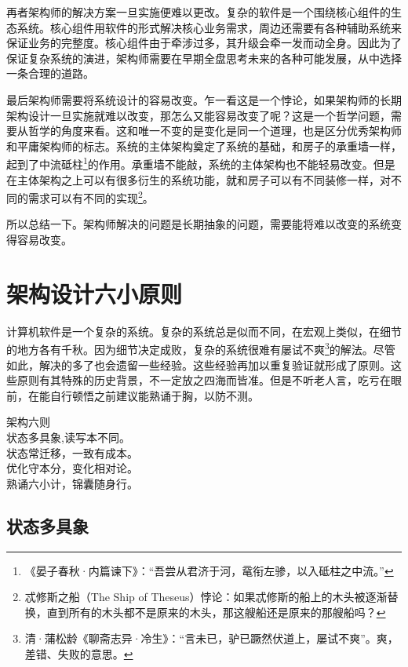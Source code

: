 再者架构师的解决方案一旦实施便难以更改。复杂的软件是一个围绕核心组件的生态系统。核心组件用软件的形式解决核心业务需求，周边还需要有各种辅助系统来保证业务的完整度。核心组件由于牵涉过多，其升级会牵一发而动全身。因此为了保证复杂系统的演进，架构师需要在早期全盘思考未来的各种可能发展，从中选择一条合理的道路。


最后架构师需要将系统设计的容易改变。乍一看这是一个悖论，如果架构师的长期架构设计一旦实施就难以改变，那怎么又能容易改变了呢？这是一个哲学问题，需要从哲学的角度来看。这和唯一不变的是变化是同一个道理，也是区分优秀架构师和平庸架构师的标志。系统的主体架构奠定了系统的基础，和房子的承重墙一样，起到了中流砥柱\footnote{《晏子春秋·内篇谏下》：“吾尝从君济于河，鼋衔左骖，以入砥柱之中流。”}的作用。承重墙不能敲，系统的主体架构也不能轻易改变。但是在主体架构之上可以有很多衍生的系统功能，就和房子可以有不同装修一样，对不同的需求可以有不同的实现\footnote{忒修斯之船（The Ship of Theseus）悖论：如果忒修斯的船上的木头被逐渐替换，直到所有的木头都不是原来的木头，那这艘船还是原来的那艘船吗？}。


所以总结一下。架构师解决的问题是长期抽象的问题，需要能将难以改变的系统变得容易改变。


\section{架构设计六小原则}

计算机软件是一个复杂的系统。复杂的系统总是似而不同，在宏观上类似，在细节的地方各有千秋。因为细节决定成败，复杂的系统很难有屡试不爽\footnote{清·蒲松龄《聊斋志异·冷生》：“言未已，驴已蹶然伏道上，屡试不爽”。爽，差错、失败的意思。}的解法。尽管如此，解决的多了也会遗留一些经验。这些经验再加以重复验证就形成了原则。这些原则有其特殊的历史背景，不一定放之四海而皆准。但是不听老人言，吃亏在眼前，在能自行顿悟之前建议能熟诵于胸，以防不测。

\begin{center}
    \begin{pinyinscope}
    架构六则\\
    状态多具象,读写本不同。\\
    状态常迁移，一致有成本。\\
    优化守本分，变化相对论。\\
    熟诵六小计，锦囊随身行。\\
    \end{pinyinscope}
\end{center}



\subsection{状态多具象}\label{statehasmultipleview}

